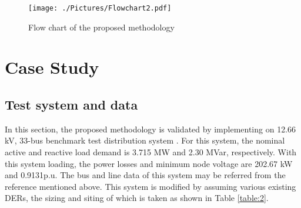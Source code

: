 \documentclass[journal]{IEEEtran}
\begin{document}
\begin{figure}
	\centering
	\texttt{[image: ./Pictures/Flowchart2.pdf]}
	\vspace{-0.2cm}
	\caption{Flow chart of the proposed methodology\vspace{-0.6cm}}
	\label{Fig:FC}
\end{figure} 
%
%
\section{Case Study}\label{section:simulation results and discussion}
\subsection{Test system and data}
In this section, the proposed methodology is validated by implementing on 12.66 kV, 33-bus benchmark test distribution system \cite{25627}. For this system, the nominal active and reactive load demand is 3.715 MW and 2.30 MVar, respectively. With this system loading, the power losses and minimum node voltage are 202.67 kW and 0.9131p.u. The bus and line data of this system may be referred from the reference mentioned above. This system is modified by assuming various existing DERs, the sizing and siting of which is taken as shown in Table \ref{table:2}.
 
\end{document}
